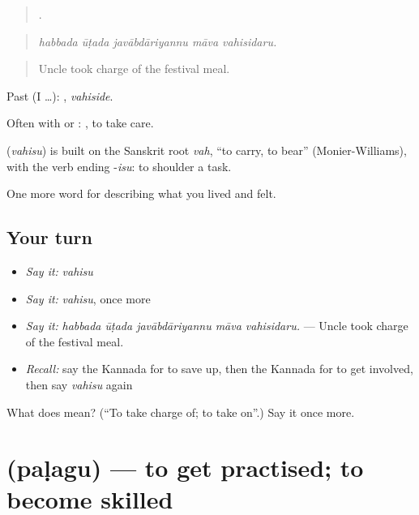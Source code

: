 \begin{quote}
    .
\end{quote}

\begin{quote}
\emph{habbada ūṭada javābdāriyannu māva vahisidaru.}
\end{quote}

\begin{quote}
Uncle took charge of the festival meal.
\end{quote}

Past (I …): , \emph{vahiside}.

Often with  or :  , to take care.

\begin{cousinweb}
\textbf{} (\emph{vahisu}) is built on the Sanskrit root \emph{vah}, \textquotedblleft{}to carry, to bear\textquotedblright{} (Monier-Williams), with the verb ending -\emph{isu}: to shoulder a task.
\end{cousinweb}

\begin{grammarlens}[title={What you've built}]
One more word for describing what you lived and felt.
\end{grammarlens}

\subsection*{Your turn}
\begin{itemize}
\raggedright
  \item \emph{Say it:} \emph{vahisu}
  \item \emph{Say it:} \emph{vahisu}, once more
  \item \emph{Say it:} \emph{habbada ūṭada javābdāriyannu māva vahisidaru.} — Uncle took charge of the festival meal.
  \item \emph{Recall:} say the Kannada for to save up, then the Kannada for to get involved, then say \emph{vahisu} again
\end{itemize}

\begin{tcolorbox}[breakable,colback=teal!4,colframe=teal!35!black,title={Before you move on}]
What does  mean? (\textquotedblleft{}To take charge of; to take on\textquotedblright{}.) Say it once more.
\end{tcolorbox}
\section[\texorpdfstring{\kn{ಪಳಗು} (paḷagu)}{ಪಳಗು (paḷagu)}]{ (paḷagu) — to get practised; to become skilled}

